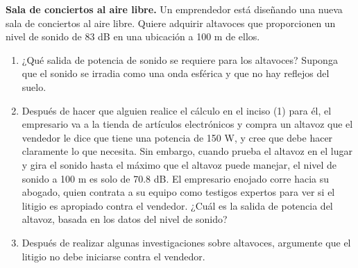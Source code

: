 \item \textbf{Sala de conciertos al aire libre.}
Un emprendedor está diseñando una nueva sala de conciertos al aire libre. Quiere adquirir altavoces que proporcionen un nivel de sonido de 83 dB en una ubicación a 100 m de ellos.
\begin{enumerate}
    \item ¿Qué salida de potencia de sonido se requiere para los altavoces? Suponga que el sonido se irradia como una onda esférica y que no hay reflejos del suelo.
    \item Después de hacer que alguien realice el cálculo en el inciso (1) para él, el empresario va a la tienda de artículos electrónicos y compra un altavoz que el vendedor le dice que tiene una potencia de 150 W, y cree que debe hacer claramente lo que necesita. Sin embargo, cuando prueba el altavoz en el lugar y gira el sonido hasta el máximo que el altavoz puede manejar, el nivel de sonido a 100 m es solo de 70.8 dB. El empresario enojado corre hacia su abogado, quien contrata a su equipo como testigos expertos para ver si el litigio es apropiado contra el vendedor. ¿Cuál es la salida de potencia del altavoz, basada en los datos del nivel de sonido?
    \item Después de realizar algunas investigaciones sobre altavoces, argumente que el litigio no debe iniciarse contra el vendedor.
\end{enumerate}